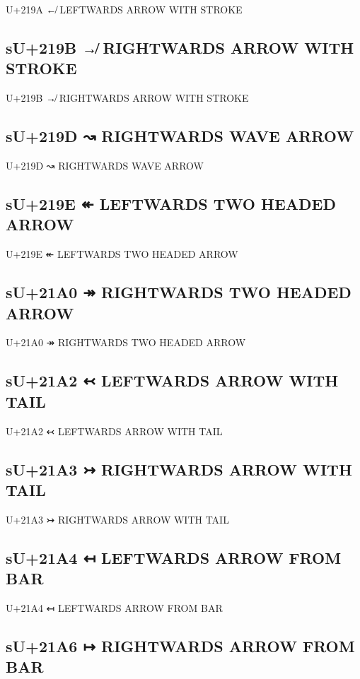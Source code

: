 U+219A ↚ LEFTWARDS ARROW WITH STROKE

\subsection{sU+219B ↛ RIGHTWARDS ARROW WITH STROKE}

U+219B ↛ RIGHTWARDS ARROW WITH STROKE

\subsection{sU+219D ↝ RIGHTWARDS WAVE ARROW}

U+219D ↝ RIGHTWARDS WAVE ARROW

\subsection{sU+219E ↞ LEFTWARDS TWO HEADED ARROW}

U+219E ↞ LEFTWARDS TWO HEADED ARROW

\subsection{sU+21A0 ↠ RIGHTWARDS TWO HEADED ARROW}

U+21A0 ↠ RIGHTWARDS TWO HEADED ARROW

\subsection{sU+21A2 ↢ LEFTWARDS ARROW WITH TAIL}

U+21A2 ↢ LEFTWARDS ARROW WITH TAIL

\subsection{sU+21A3 ↣ RIGHTWARDS ARROW WITH TAIL}

U+21A3 ↣ RIGHTWARDS ARROW WITH TAIL

\subsection{sU+21A4 ↤ LEFTWARDS ARROW FROM BAR}

U+21A4 ↤ LEFTWARDS ARROW FROM BAR

\subsection{sU+21A6 ↦ RIGHTWARDS ARROW FROM BAR}

